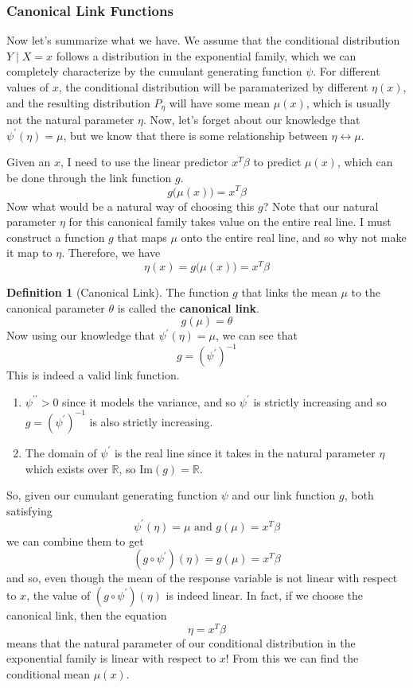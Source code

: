 \documentclass{article}
\theoremstyle{definition}
\theoremstyle{remark}
\theoremstyle{definition}
\newtheorem{definition}{Definition}[section]
\begin{document}
\subsubsection{Canonical Link Functions}

Now let's summarize what we have. We assume that the conditional distribution $Y \mid X = x$ follows a distribution in the exponential family, which we can completely characterize by the cumulant generating function $\psi$. For different values of $x$, the conditional distribution will be paramaterized by different $\eta (x)$, and the resulting distribution $P_\eta$ will have some mean $\mu(x)$, which is usually not the natural parameter $\eta$. Now, let's forget about our knowledge that $\psi^\prime(\eta) = \mu$, but we know that there is some relationship between $\eta \leftrightarrow \mu$.

Given an $x$, I need to use the linear predictor $x^T \beta$ to predict $\mu(x)$, which can be done through the link function $g$. 
\[g\big( \mu(x) \big) = x^T \beta\]
Now what would be a natural way of choosing this $g$? Note that our natural parameter $\eta$ for this canonical family takes value on the entire real line. I must construct a function $g$ that maps $\mu$ onto the entire real line, and so why not make it map to $\eta$. Therefore, we have 
\[\eta(x) = g\big( \mu(x) \big) = x^T \beta\]

\begin{definition}[Canonical Link]
The function $g$ that links the mean $\mu$ to the canonical parameter $\theta$ is called the \textbf{canonical link}. 
\[g(\mu) = \theta\]
Now using our knowledge that $\psi^\prime(\eta) = \mu$, we can see that 
\[g = (\psi^\prime)^{-1}\]
This is indeed a valid link function. 
\begin{enumerate}
    \item $\psi^{\prime\prime} > 0$ since it models the variance, and so $\psi^\prime$ is strictly increasing and so $g = (\psi^\prime)^{-1}$ is also strictly increasing. 
    \item The domain of $\psi^\prime$ is the real line since it takes in the natural parameter $\eta$ which exists over $\mathbb{R}$, so $\mathrm{Im}(g) = \mathbb{R}$. 
\end{enumerate}
\end{definition}

So, given our cumulant generating function $\psi$ and our link function $g$, both satisfying 
\[\psi^\prime (\eta) = \mu \text{ and } g(\mu) = x^T \beta\]
we can combine them to get 
\[(g \circ \psi^\prime) (\eta) = g(\mu) = x^T \beta\]
and so, even though the mean of the response variable is not linear with respect to $x$, the value of $(g \circ \psi^\prime) (\eta)$ is indeed linear. In fact, if we choose the canonical link, then the equation 
\[\eta = x^T \beta\]
means that the natural parameter of our conditional distribution in the exponential family is linear with respect to $x$! From this we can find the conditional mean $\mu(x)$. 
\end{document}
